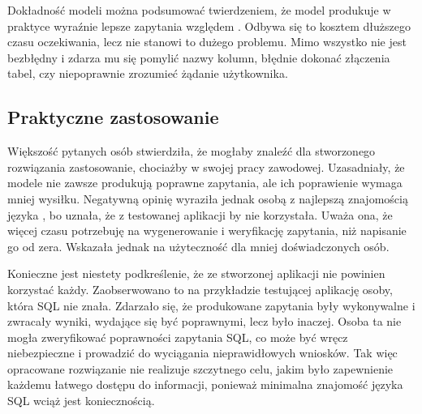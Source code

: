 Dokładność modeli można podsumować twierdzeniem, że model  produkuje w praktyce wyraźnie lepsze zapytania względem . Odbywa się to kosztem dłuższego czasu oczekiwania, lecz nie stanowi to dużego problemu. Mimo wszystko  nie jest bezbłędny i zdarza mu się pomylić nazwy kolumn, błędnie dokonać złączenia tabel, czy niepoprawnie zrozumieć żądanie użytkownika.

\subsection{Praktyczne zastosowanie}
Większość pytanych osób stwierdziła, że mogłaby znaleźć dla stworzonego rozwiązania zastosowanie, chociażby w swojej pracy zawodowej. Uzasadniały, że modele nie zawsze produkują poprawne zapytania, ale ich poprawienie wymaga mniej wysiłku. Negatywną opinię wyraziła jednak osobą z najlepszą znajomością języka , bo uznała, że z testowanej aplikacji by nie korzystała. Uważa ona, że więcej czasu potrzebuję na wygenerowanie i weryfikację zapytania, niż napisanie go od zera. Wskazała jednak na użyteczność dla mniej doświadczonych osób.

Konieczne jest niestety podkreślenie, że ze stworzonej aplikacji nie powinien korzystać każdy. Zaobserwowano to na przykładzie testującej aplikację osoby, która SQL nie znała. Zdarzało się, że produkowane zapytania były wykonywalne i zwracały wyniki, wydające się być poprawnymi, lecz było inaczej. Osoba ta nie mogła zweryfikować poprawności zapytania SQL, co może być wręcz niebezpieczne i prowadzić do wyciągania nieprawidłowych wniosków. Tak więc opracowane rozwiązanie nie realizuje szczytnego celu, jakim było zapewnienie każdemu łatwego dostępu do informacji, ponieważ minimalna znajomość języka SQL wciąż jest koniecznością.